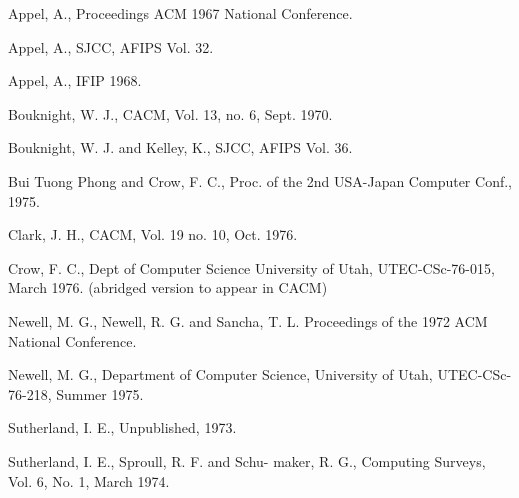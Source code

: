 \begin{thebibliography}{99} %
		
		Appel, A.,
		\newblock Proceedings ACM 1967 National Conference.
		
		Appel, A.,
		 SJCC, AFIPS Vol. 32.
		
		Appel, A.,
		\newblock IFIP 1968.
		
		Bouknight, W. J.,
		\newblock CACM, Vol. 13, no. 6, Sept. 1970.
		
		Bouknight, W. J. and Kelley, K.,
		 SJCC, AFIPS Vol. 36.
		
		Bui Tuong Phong and Crow, F. C.,
		\newblock Proc. of the 2nd USA-Japan Computer Conf., 1975.
		
		Clark, J. H.,
		\newblock CACM, Vol. 19 no. 10, Oct. 1976.
		
		Crow, F. C.,
		\newblock Dept of Computer Science University of Utah, UTEC-CSc-76-015, March 1976. (abridged version to appear in CACM)
		
		Newell, M. G., Newell, R. G. and Sancha, T. L.
		\newblock Proceedings of the 1972 ACM National Conference.
		
		Newell, M. G.,
		\newblock Department of Computer Science, University of Utah, UTEC-CSc-76-218, Summer 1975.
		
		Sutherland, I. E.,
		\newblock Unpublished, 1973.
		
		Sutherland, I. E., Sproull, R. F. and Schu- maker, R. G.,
		\newblock Computing Surveys, Vol. 6, No. 1, March 1974.
		
\end{thebibliography}